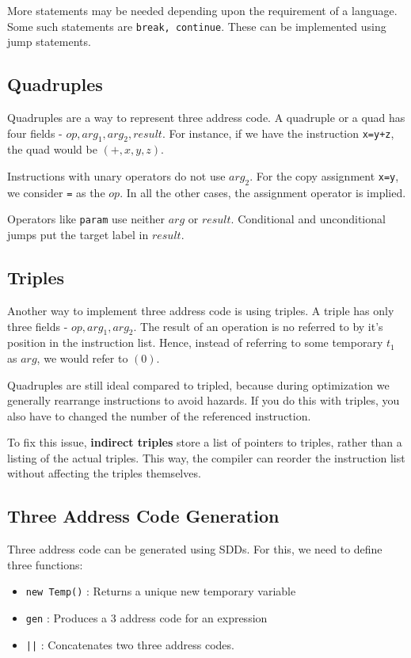 \documentclass[12pt,letterpaper]{book}
\theoremstyle{definition}
\begin{document}
More statements may be needed depending upon the requirement of a language. Some such statements are \texttt{break, continue}. These can be implemented using jump statements.

\subsection{Quadruples}

Quadruples are a way to represent three address code. A quadruple or a quad has four fields - $op, arg_1, arg_2, result$. For instance, if we have the instruction \texttt{x=y+z}, the quad would be $(+,x,y,z)$.

Instructions with unary operators do not use $arg_2$. For the copy assignment \texttt{x=y}, we consider \texttt{=} as the $op$. In all the other cases, the assignment operator is implied.

Operators like \texttt{param} use neither $arg$ or $result$. Conditional and unconditional jumps put the target label in $result$.

\subsection{Triples}

Another way to implement three address code is using triples. A triple has only three fields - $op,arg_1,arg_2$. The result of an operation is no referred to by it's position in the instruction list. Hence, instead of referring to some temporary $t_1$ as $arg$, we would refer to $(0)$.

Quadruples are still ideal compared to tripled, because during optimization we generally rearrange instructions to avoid hazards. If you do this with triples, you also have to changed the number of the referenced instruction.

To fix this issue, \textbf{indirect triples}  store a list of pointers to triples, rather than a listing of the actual triples. This way, the compiler can reorder the instruction list without affecting the triples themselves.

\subsection{Three Address Code Generation}

Three address code can be generated using SDDs. For this, we need to define three functions:

\begin{itemize}
  \item \texttt{new Temp()} : Returns a unique new temporary variable
  \item \texttt{gen} : Produces a 3 address code for an expression
  \item \texttt{||} : Concatenates two three address codes.
\end{itemize}
\end{document}
